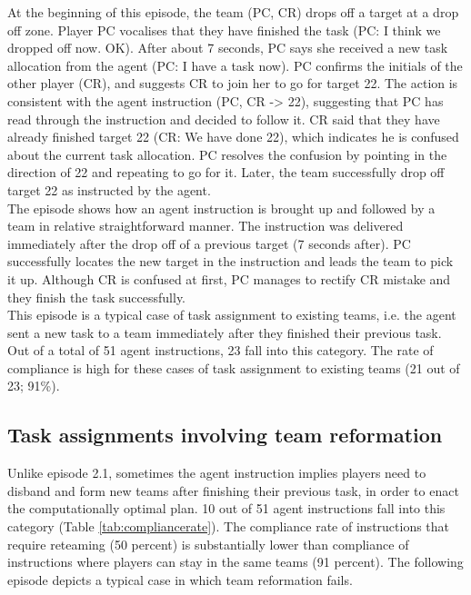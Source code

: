 At the beginning of this episode, the team (PC, CR) drops off a target at a drop off zone. Player PC vocalises that they have finished the task (PC: I think we dropped off now. OK).  After about 7 seconds, PC says she received a new task allocation from the agent (PC: I have a task now). PC confirms the initials of the other player (CR), and suggests CR to join her to go for target 22. The action is consistent with the agent instruction (PC, CR -> 22), suggesting that PC has read through the instruction and decided to follow it. CR said that they have already finished target 22 (CR: We have done 22), which indicates he is confused about the current task allocation. PC resolves the confusion by pointing in the direction of 22 and repeating to go for it. Later, the team successfully drop off target 22 as instructed by the agent.\\

The episode shows how an agent instruction is brought up and followed by a team in relative straightforward manner. The instruction was delivered immediately after the drop off of a previous target (7 seconds after). PC successfully locates the new target in the instruction and leads the team to pick it up. Although CR is confused at first, PC manages to rectify CR mistake and they finish the task successfully. \\

This episode is a typical case of task assignment to existing teams, i.e. the agent sent a new task to a team immediately after they finished their previous task. Out of a total of 51 agent instructions, 23 fall into this category. The rate of compliance is high for these cases of task assignment to existing teams (21 out of 23; 91\%). \\

\subsection{Task assignments involving team reformation}
Unlike episode 2.1, sometimes the agent instruction implies players need to disband and form new teams after finishing their previous task, in order to enact the computationally optimal plan. 10 out of 51 agent instructions fall into this category (Table \ref{tab:compliancerate}). The compliance rate of instructions that require reteaming (50 percent) is substantially lower than compliance of instructions where players can stay in the same teams (91 percent). The following episode depicts a typical case in which team reformation fails.\\

